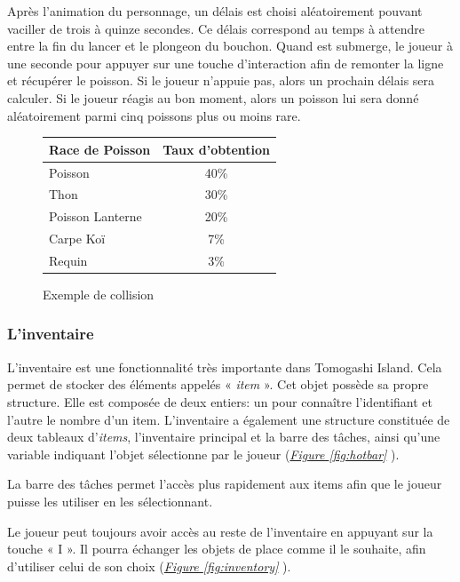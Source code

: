 \documentclass{article}
\begin{document}
        Après l'animation du personnage, un délais est choisi aléatoirement pouvant vaciller de trois à quinze secondes. Ce délais correspond au temps à attendre entre la fin du lancer et le plongeon du bouchon. Quand est submerge, le joueur à une seconde pour appuyer sur une touche d'interaction afin de remonter la ligne et récupérer le poisson. Si le joueur n'appuie pas, alors un prochain délais sera calculer. Si le joueur réagis au bon moment, alors un poisson lui sera donné aléatoirement parmi cinq poissons plus ou moins rare. 
        
        \begin{figure} 
        
        \begin{tabular}{|l|c|}
            Race de Poisson & Taux d'obtention \\
            \hline
            Poisson          &  40\% \\
            Thon             &  30\% \\
            Poisson Lanterne &  20\% \\
            Carpe Koï        &   7\% \\
            Requin           &   3\% \\
        \end{tabular}
            
            \centering
            \caption{Exemple de collision}
            \label{fig:poissons}
        \end{figure}
        
        \subsubsection{L'inventaire}
        L'inventaire est une fonctionnalité très importante dans Tomogashi Island. Cela permet de stocker des éléments appelés « \textit{item} ». Cet objet possède sa propre structure. Elle est composée de deux entiers: un pour connaître l'identifiant et l'autre le nombre d'un item.
        L'inventaire a également une structure constituée de deux tableaux d'\textit{items}, l'inventaire principal et la barre des tâches, ainsi qu'une variable indiquant l'objet sélectionne par le joueur (\textit{\hyperref[fig:hotbar]{Figure \ref{fig:hotbar}}} ).

        La barre des tâches permet l'accès plus rapidement aux items afin que le joueur puisse les utiliser en les sélectionnant. 

        Le joueur peut toujours avoir accès au reste de l'inventaire en appuyant sur la touche « I ». Il pourra échanger les objets de place comme il le souhaite, afin d'utiliser celui de son choix (\textit{\hyperref[fig:inventory]{Figure \ref{fig:inventory}}} ).
\end{document}
